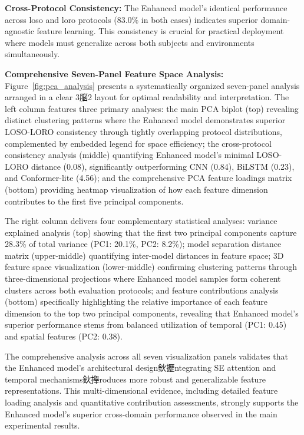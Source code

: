 \documentclass[journal]{IEEEtran}
\begin{document}
\textbf{Cross-Protocol Consistency:} The Enhanced model's identical performance across \gls{loso} and \gls{loro} protocols (83.0\% in both cases) indicates superior domain-agnostic feature learning. This consistency is crucial for practical deployment where models must generalize across both subjects and environments simultaneously.

\textbf{Comprehensive Seven-Panel Feature Space Analysis:} Figure~\ref{fig:pca_analysis} presents a systematically organized seven-panel analysis arranged in a clear 3脳2 layout for optimal readability and interpretation. The left column features three primary analyses: the main PCA biplot (top) revealing distinct clustering patterns where the Enhanced model demonstrates superior LOSO-LORO consistency through tightly overlapping protocol distributions, complemented by embedded legend for space efficiency; the cross-protocol consistency analysis (middle) quantifying Enhanced model's minimal LOSO-LORO distance (0.08), significantly outperforming CNN (0.84), BiLSTM (0.23), and Conformer-lite (4.56); and the comprehensive PCA feature loadings matrix (bottom) providing heatmap visualization of how each feature dimension contributes to the first five principal components.

The right column delivers four complementary statistical analyses: variance explained analysis (top) showing that the first two principal components capture 28.3\% of total variance (PC1: 20.1\%, PC2: 8.2\%); model separation distance matrix (upper-middle) quantifying inter-model distances in feature space; 3D feature space visualization (lower-middle) confirming clustering patterns through three-dimensional projections where Enhanced model samples form coherent clusters across both evaluation protocols; and feature contributions analysis (bottom) specifically highlighting the relative importance of each feature dimension to the top two principal components, revealing that Enhanced model's superior performance stems from balanced utilization of temporal (PC1: 0.45) and spatial features (PC2: 0.38).

The comprehensive analysis across all seven visualization panels validates that the Enhanced model's architectural design鈥攊ntegrating SE attention and temporal mechanisms鈥攑roduces more robust and generalizable feature representations. This multi-dimensional evidence, including detailed feature loading analysis and quantitative contribution assessments, strongly supports the Enhanced model's superior cross-domain performance observed in the main experimental results.
\end{document}
